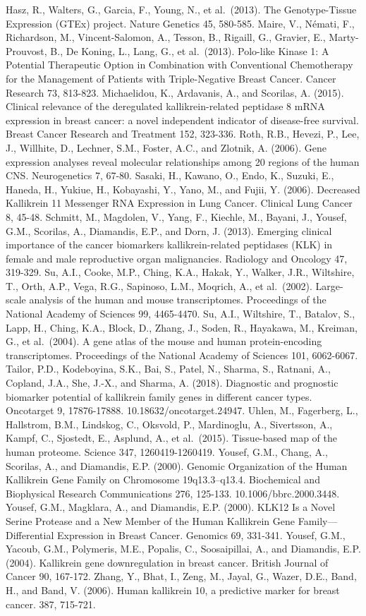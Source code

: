 \documentclass[
]{article}
\begin{document}
Hasz, R., Walters, G., Garcia, F., Young, N., et al.~(2013). The
Genotype-Tissue Expression (GTEx) project. Nature Genetics 45, 580-585.
Maire, V., Némati, F., Richardson, M., Vincent-Salomon, A., Tesson, B.,
Rigaill, G., Gravier, E., Marty-Prouvost, B., De Koning, L., Lang, G.,
et al.~(2013). Polo-like Kinase 1: A Potential Therapeutic Option in
Combination with Conventional Chemotherapy for the Management of
Patients with Triple-Negative Breast Cancer. Cancer Research 73,
813-823. Michaelidou, K., Ardavanis, A., and Scorilas, A. (2015).
Clinical relevance of the deregulated kallikrein-related peptidase 8
mRNA expression in breast cancer: a novel independent indicator of
disease-free survival. Breast Cancer Research and Treatment 152,
323-336. Roth, R.B., Hevezi, P., Lee, J., Willhite, D., Lechner, S.M.,
Foster, A.C., and Zlotnik, A. (2006). Gene expression analyses reveal
molecular relationships among 20 regions of the human CNS. Neurogenetics
7, 67-80. Sasaki, H., Kawano, O., Endo, K., Suzuki, E., Haneda, H.,
Yukiue, H., Kobayashi, Y., Yano, M., and Fujii, Y. (2006). Decreased
Kallikrein 11 Messenger RNA Expression in Lung Cancer. Clinical Lung
Cancer 8, 45-48. Schmitt, M., Magdolen, V., Yang, F., Kiechle, M.,
Bayani, J., Yousef, G.M., Scorilas, A., Diamandis, E.P., and Dorn, J.
(2013). Emerging clinical importance of the cancer biomarkers
kallikrein-related peptidases (KLK) in female and male reproductive
organ malignancies. Radiology and Oncology 47, 319-329. Su, A.I., Cooke,
M.P., Ching, K.A., Hakak, Y., Walker, J.R., Wiltshire, T., Orth, A.P.,
Vega, R.G., Sapinoso, L.M., Moqrich, A., et al.~(2002). Large-scale
analysis of the human and mouse transcriptomes. Proceedings of the
National Academy of Sciences 99, 4465-4470. Su, A.I., Wiltshire, T.,
Batalov, S., Lapp, H., Ching, K.A., Block, D., Zhang, J., Soden, R.,
Hayakawa, M., Kreiman, G., et al.~(2004). A gene atlas of the mouse and
human protein-encoding transcriptomes. Proceedings of the National
Academy of Sciences 101, 6062-6067. Tailor, P.D., Kodeboyina, S.K., Bai,
S., Patel, N., Sharma, S., Ratnani, A., Copland, J.A., She, J.-X., and
Sharma, A. (2018). Diagnostic and prognostic biomarker potential of
kallikrein family genes in different cancer types. Oncotarget 9,
17876-17888. 10.18632/oncotarget.24947. Uhlen, M., Fagerberg, L.,
Hallstrom, B.M., Lindskog, C., Oksvold, P., Mardinoglu, A., Sivertsson,
A., Kampf, C., Sjostedt, E., Asplund, A., et al.~(2015). Tissue-based
map of the human proteome. Science 347, 1260419-1260419. Yousef, G.M.,
Chang, A., Scorilas, A., and Diamandis, E.P. (2000). Genomic
Organization of the Human Kallikrein Gene Family on Chromosome
19q13.3--q13.4. Biochemical and Biophysical Research Communications 276,
125-133. 10.1006/bbrc.2000.3448. Yousef, G.M., Magklara, A., and
Diamandis, E.P. (2000). KLK12 Is a Novel Serine Protease and a New
Member of the Human Kallikrein Gene Family---Differential Expression in
Breast Cancer. Genomics 69, 331-341. Yousef, G.M., Yacoub, G.M.,
Polymeris, M.E., Popalis, C., Soosaipillai, A., and Diamandis, E.P.
(2004). Kallikrein gene downregulation in breast cancer. British Journal
of Cancer 90, 167-172. Zhang, Y., Bhat, I., Zeng, M., Jayal, G., Wazer,
D.E., Band, H., and Band, V. (2006). Human kallikrein 10, a predictive
marker for breast cancer. 387, 715-721.
\end{document}
